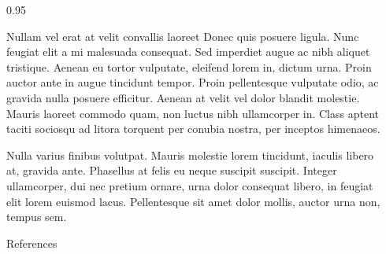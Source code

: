 \documentclass[final]{beamer}
\newlength{\sepwidth}
\newlength{\colwidth}
\newcommand{\separatorcolumn}{\begin{column}{\sepwidth}\end{column}}
\begin{document}
\begin{frame}[t]
\begin{columns}[t]
\begin{column}{0.95\colwidth}
\begin{block}{Nullam vel erat at velit convallis laoreet}
    Donec quis posuere ligula. Nunc feugiat elit a mi malesuada consequat. Sed
    imperdiet augue ac nibh aliquet tristique. Aenean eu tortor vulputate,
    eleifend lorem in, dictum urna. Proin auctor ante in augue tincidunt
    tempor. Proin pellentesque vulputate odio, ac gravida nulla posuere
    efficitur. Aenean at velit vel dolor blandit molestie. Mauris laoreet
    commodo quam, non luctus nibh ullamcorper in. Class aptent taciti sociosqu
    ad litora torquent per conubia nostra, per inceptos himenaeos.

    Nulla varius finibus volutpat. Mauris molestie lorem tincidunt, iaculis
    libero at, gravida ante. Phasellus at felis eu neque suscipit suscipit.
    Integer ullamcorper, dui nec pretium ornare, urna dolor consequat libero,
    in feugiat elit lorem euismod lacus. Pellentesque sit amet dolor mollis,
    auctor urna non, tempus sem.

  \end{block}

  \begin{block}{References}

    \nocite{*}
    \footnotesize{}

  \end{block}

\end{column}

\separatorcolumn
\end{columns}
\end{frame}
\end{document}
